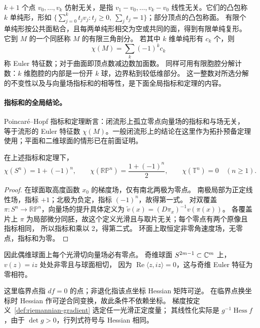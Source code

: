 \begin{definition}\label{def:euler-characteristic}
$k+1$ 个点 $v_0,\ldots,v_k$ 仿射无关，是指 $v_1-v_0,\ldots,v_k-v_0$ 线性无关。它们的凸包称 $k$ 单纯形，形如
$\{\sum_{j=0}^kt_jv_j:t_j\geq0,\ \sum_jt_j=1\}$；部分顶点的凸包称面。
有限个单纯形按公共面粘合，且每两单纯形相交为空或共同的面，得到有限单纯复形。
它到 $M$ 的一个同胚称 $M$ 的有限三角剖分。
若其中 $k$ 维单纯形有 $c_k$ 个，则
\[
 \chi(M)=\sum_k(-1)^kc_k
\]
称 Euler 特征数；对于曲面即顶点数减边数加面数。
同样可用有限胞腔分解计数：$k$ 维胞腔的内部是一份开 $k$ 球，边界粘到较低维部分。
这一整数对所选分解的不变性以及与向量场指标和的相等性，是下面全局指标和定理的内容。
\end{definition}

\paragraph{指标和的全局结论。}
Poincaré--Hopf 指标和定理断言：闭流形上孤立零点向量场的指标和与场无关，
等于流形的 Euler 特征数 $\chi(M)$。一般闭流形上的结论在这里作为拓扑预备定理使用；平面和二维球面的情形已在前面证明。

\begin{proposition}[球面、射影空间和环面]
在上述指标和定理下，
\[
 \chi(S^n)=1+(-1)^n,\qquad
 \chi(\mathbb{RP}^n)=\frac{1+(-1)^n}{2},\qquad
 \chi(\mathbb T^n)=0\quad(n\geq1).
\]
\end{proposition}
\begin{proof}
在球面取高度函数 $x_0$ 的梯度场，仅有南北两极为零点。
南极局部为正定线性场，指标 $+1$；北极为负定，指标 $(-1)^n$，故得第一式。
对双覆盖 $\pi:S^n\to\mathbb{RP}^n$，向量场的提升具体定义为
$\widetilde v(x)=(D\pi_x)^{-1}v(\pi(x))$。
各覆盖片上 $\pi$ 为局部微分同胚，故这个定义光滑且与取片无关；每个零点有两个原像且指标相同，
所以指标和乘以 2，得第二式。
环面上取恒定非零角速度场，无零点，指标和为零。
\end{proof}
因此偶维球面上每个光滑切向量场必有零点。
奇维球面 $S^{2m-1}\subset\mathbb{C}^m$ 上，$v(z)=iz$ 处处非零且与球面相切，
因为 $\operatorname{Re}\langle z,iz\rangle=0$，这与奇维 Euler 特征为零相符。

\noindent
这里临界点指 $df=0$ 的点；非退化指该点坐标 Hessian 矩阵可逆。
在临界点换坐标时 Hessian 作可逆合同变换，故此条件不依赖坐标。
梯度按定义~\ref{def:riemannian-gradient} 选定任一光滑正定度量；
其线性化实际是 $g^{-1}\operatorname{Hess}f$，由于 $\det g>0$，行列式符号与 Hessian 相同。
\medskip

